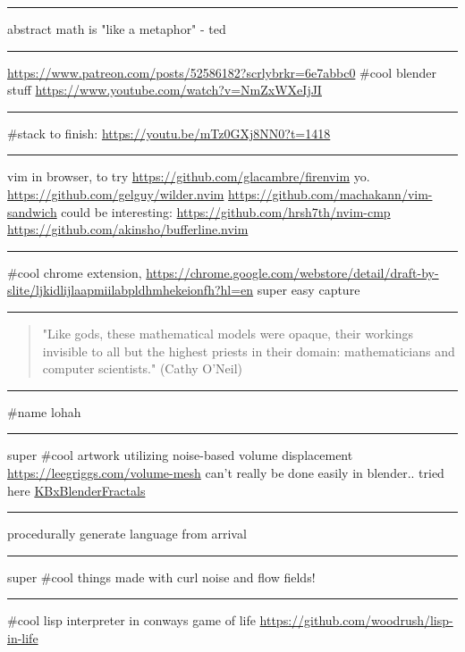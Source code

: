 \documentclass[letterpaper]{article}
\begin{document}
\noindent\rule{\textwidth}{0.5pt}

abstract math is "like a metaphor" - ted

\noindent\rule{\textwidth}{0.5pt}

\url{https://www.patreon.com/posts/52586182?scrlybrkr=6e7abbc0} \#cool blender
stuff \url{https://www.youtube.com/watch?v=NmZxWXeIjJI}

\noindent\rule{\textwidth}{0.5pt}

\#stack to finish: \url{https://youtu.be/mTz0GXj8NN0?t=1418}

\noindent\rule{\textwidth}{0.5pt}

vim in browser, to try \url{https://github.com/glacambre/firenvim} yo.
\url{https://github.com/gelguy/wilder.nvim}
\url{https://github.com/machakann/vim-sandwich} could be interesting:
\url{https://github.com/hrsh7th/nvim-cmp}
\url{https://github.com/akinsho/bufferline.nvim}

\noindent\rule{\textwidth}{0.5pt}

\#cool chrome extension,
\url{https://chrome.google.com/webstore/detail/draft-by-slite/ljkidlijlaapmiilabpldhmhekeionfh?hl=en}
super easy capture

\noindent\rule{\textwidth}{0.5pt}

\begin{quote}
"Like gods, these mathematical models were opaque, their workings
invisible to all but the highest priests in their domain:
mathematicians and computer scientists." (Cathy O'Neil)
\end{quote}

\noindent\rule{\textwidth}{0.5pt}

\#name lohah

\noindent\rule{\textwidth}{0.5pt}

super \#cool artwork utilizing noise-based volume displacement
\url{https://leegriggs.com/volume-mesh} can't really be done easily in
blender.. tried here \href{KBxBlenderFractals.org}{KBxBlenderFractals}

\noindent\rule{\textwidth}{0.5pt}

procedurally generate language from arrival

\noindent\rule{\textwidth}{0.5pt}

super \#cool things made with curl noise and flow fields!

\noindent\rule{\textwidth}{0.5pt}

\#cool lisp interpreter in conways game of life
\url{https://github.com/woodrush/lisp-in-life}
\end{document}

